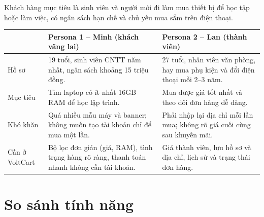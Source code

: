 \documentclass[12pt,a4paper]{article}   %
\newcommand{\ProjectName}{VoltCart}
\begin{document}
Khách hàng mục tiêu là sinh viên và người mới đi làm mua thiết bị để học tập hoặc làm việc,
có ngân sách hạn chế và chủ yếu mua sắm trên điện thoại.

\begin{tabularx}{\linewidth}{|L{2.4cm}|Y|Y|}
\hline
{}  & \textbf{Persona 1 -- Minh (khách vãng lai)} & \textbf{Persona 2 -- Lan (thành viên)} \\ \hline \endhead
Hồ sơ       & 19 tuổi, sinh viên CNTT năm nhất, ngân sách khoảng 15 triệu đồng. &
              27 tuổi, nhân viên văn phòng, hay mua phụ kiện và đổi điện thoại mỗi 2--3 năm. \\ \hline
Mục tiêu    & Tìm laptop có ít nhất 16GB RAM để học lập trình. &
              Mua được giá tốt nhất và theo dõi đơn hàng dễ dàng. \\ \hline
Khó khăn    & Quá nhiều mẫu máy và banner; không muốn tạo tài khoản chỉ để mua một lần. &
              Phải nhập lại địa chỉ mỗi lần mua; không rõ giá cuối cùng sau khuyến mãi. \\ \hline
Cần ở \ProjectName{} & Bộ lọc đơn giản (giá, RAM), tình trạng hàng rõ ràng, thanh toán nhanh không cần tài khoản. &
              Giá thành viên, lưu hồ sơ và địa chỉ, lịch sử và trạng thái đơn hàng. \\ \hline
\end{tabularx}

\section{So sánh tính năng}
\end{document}
